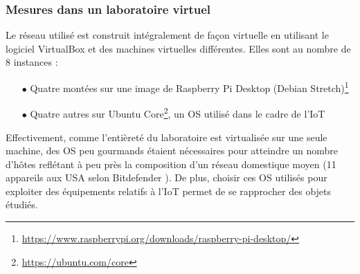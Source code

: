\documentclass[]{article}
\newcommand{\minit}[1]{\noindent{\small\textbf{ \underline{#1}}}\vspace{0.2cm}}
\begin{document}
\newpage

\subsubsection{Mesures dans un laboratoire virtuel}

Le réseau utilisé est construit intégralement de façon virtuelle en utilisant le logiciel VirtualBox et des machines virtuelles différentes. Elles sont au nombre de 8 instances :~\\
\begin{itemize}
\item[$\bullet$] Quatre montées sur une image de Raspberry Pi Desktop (Debian Stretch)\footnote{\url{https://www.raspberrypi.org/downloads/raspberry-pi-desktop/}}
\item[$\bullet$] Quatre autres sur Ubuntu Core\footnote{\url{https://ubuntu.com/core}}, un OS utilisé dans le cadre de l'IoT
\end{itemize}

\vspace{0.2cm}

\par Effectivement, comme l'entièreté du laboratoire est virtualisée sur une seule machine, des OS peu gourmands étaient nécessaires pour atteindre un nombre d'hôtes reflétant à peu près la composition d'un réseau domestique moyen (11 appareils aux USA selon Bitdefender \cite{bitdefender}). De plus, choisir ces OS utilisés pour exploiter des équipements relatifs à l'IoT permet de se rapprocher des objets étudiés.\\

\minit{Mesures pour \texttt{fping}}
\vspace{0.1cm}
\end{document}
